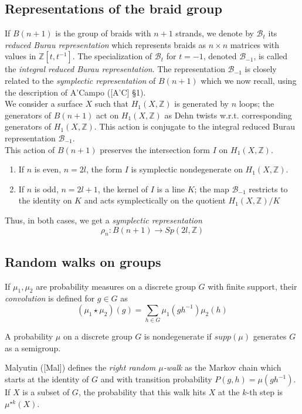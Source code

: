 \documentclass[12pt]{article}
\begin{document}
\subsection{Representations of the braid group}\label{paragraphe sur les representations}
If $B(n+1)$ is the group of braids with $n+1$ strands, we denote by 
$\mathcal B_t$ its {\it reduced Burau representation} which represents braids as $n\times n$ matrices with values in $\mathbb{Z}[t,t^{-1}]$. The specialization of $\mathcal B_t$ for $t=-1$, denoted $\mathcal B_{-1}$, is called the {\it integral reduced Burau representation}. The representation $\mathcal B_{-1}$ is closely related to the {\it symplectic representation} of $B(n+1)$ which we now recall, using the description of A'Campo ([A'C] \S  1).\\
We consider a surface $X$ such that $H_1(X,\mathbb{Z})$ is generated by $n$ loops; the generators of $B(n+1)$ act on $H_1(X,\mathbb{Z})$ as Dehn twists w.r.t. corresponding generators of $H_1(X,\mathbb{Z})$. This action is conjugate to the integral reduced Burau representation ${\mathcal B}_{-1}$. \\  
This action of $B(n+1)$ preserves the intersection form $I$ on $H_1(X,\mathbb{Z})$. 
\begin{enumerate}
	\item 
	If $n$ is even, $n=2l$, the form $I$ is symplectic nondegenerate on $H_1(X,\mathbb{Z})$.
	\item
	If $n$ is odd, $n=2l+1$, the kernel of $I$ is a line $K$; the map $\mathcal B_{-1}$ restricts to the identity on $K$ and  acts symplectically on the quotient $H_1(X,\mathbb{Z})/K$ 
\end{enumerate}
Thus, in both cases, we get  a {\it symplectic representation}
\begin{equation}\label{representation symplectique0}
\rho_n:B(n+1)\longrightarrow Sp(2l,\mathbb{Z})
\end{equation} 
\subsection{Random walks on groups}\label{paragraph on random walks}
If $\mu_1,\mu_2$ are probability measures on a discrete group $G$ with finite support, their {\it convolution} is defined for $g\in G$ as 
\begin{equation}\label{definition de la convolution}
(\mu_1\star\mu_2)(g)=\sum_{h\in G}\mu_1(gh^{-1})\mu_2(h)
\end{equation}
\begin{defn}\label{non degenerate}
	A  probability $\mu$ on a discrete group $G$ is nondegenerate if $supp(\mu)$ generates $G$ as a semigroup.\end{defn} Malyutin ([Mal]) defines the {\it  right random $\mu$-walk} as the Markov chain which starts at the identity of $G$ and with transition probability $P(g,h)=\mu(gh^{-1})$. If $X$ is a subset of $G$, the probability that this walk hits $X$ at the $k$-th step is $\mu^{\star k}(X)$. 
\end{document}
